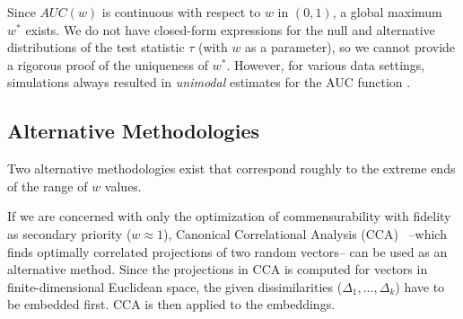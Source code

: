 \documentclass[11pt]{article} %
\begin{document}
Since $AUC(w)$ is continuous with respect to $w$ in $(0,1)$, a global maximum $w^*$ exists. We do not have closed-form expressions for the null and alternative distributions of the test statistic $\tau$ (with $w$ as a parameter), so we cannot provide a rigorous proof of the uniqueness of $w^*$. However, for various data settings, simulations always resulted in \emph{unimodal}  estimates for the AUC function .

\subsection{Alternative Methodologies}

Two alternative methodologies exist that correspond roughly to the extreme ends of the range of $w$ values. 

If we are concerned with only the optimization of commensurability with fidelity as secondary priority ($w\approx 1$), Canonical Correlational Analysis (CCA)~\cite{Hardoon2004} --which finds optimally correlated projections of two random vectors-- can be used as an alternative method. Since the projections in CCA is computed  for vectors in finite-dimensional Euclidean space, the given dissimilarities ($\Delta_1,\ldots,\Delta_k$) have to be embedded first. CCA is then  applied to the  embeddings.
\end{document}
